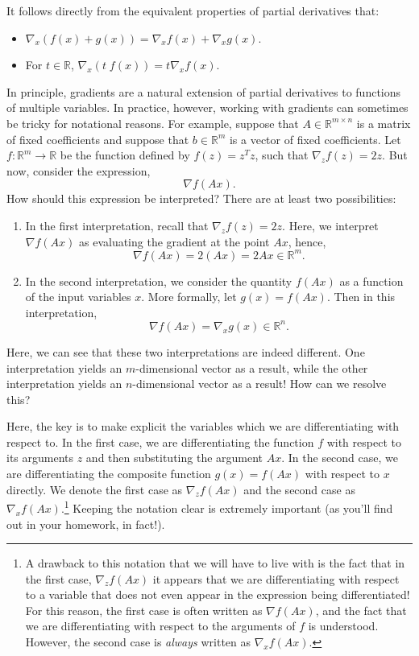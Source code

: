 \documentclass[12pt]{article}
\begin{document}
It follows directly from the equivalent properties of partial
derivatives that:
\begin{itemize}
\item $\nabla_x (f(x) + g(x)) = \nabla_x f(x) + \nabla_x g(x)$.
\item For $t \in \mathbb{R}$, $\nabla_x (t\;f(x)) = t \nabla_x f(x)$.
\end{itemize}

In principle, gradients are a natural extension of partial derivatives
to functions of multiple variables.  In practice, however, working with
gradients can sometimes be tricky for notational reasons.  
For example,
suppose that $A \in \mathbb{R}^{m \times n}$ is a matrix of fixed coefficients and 
suppose that $b \in \mathbb{R}^m$ is a vector of fixed coefficients.
Let $f : \mathbb{R}^{m} \rightarrow \mathbb{R}$ be the function defined by
$f(z) = z^T z$, such that $\nabla_z f(z) = 2z$.
But now, consider the expression,
\[ \nabla f(Ax). \]
How should this expression be interpreted?  There are at least two possibilities:
\begin{enumerate}
\item 
  In the first interpretation, recall that $\nabla_z f(z) = 2z$.  Here, we
  interpret $\nabla f(Ax)$ as evaluating the gradient at the point $Ax$, 
  hence, 
  \[ \nabla f(Ax) = 2(Ax) = 2Ax \in \mathbb{R}^m. \]
\item
  In the second interpretation, we consider the quantity $f(Ax)$ as a function of the
  input variables $x$.  More formally, let $g(x) = f(Ax)$.  Then in this interpretation,
  \[ \nabla f(Ax) = \nabla_x g(x) \in \mathbb{R}^n. \]
\end{enumerate}
Here, we can see that these two interpretations are indeed different.  One interpretation
yields an $m$-dimensional vector as a result, while the other interpretation yields an
$n$-dimensional vector as a result!  How can we resolve this?

Here, the key is to make explicit the variables which we are differentiating with respect to.
In the first case, we are differentiating the function $f$ with respect to its arguments $z$
and then substituting the argument $Ax$.  In the second case, we are differentiating the
composite function $g(x) = f(Ax)$ with respect to $x$ directly.  We denote the first
case as $\nabla_z f(Ax)$ and the second case as $\nabla_x f(Ax)$.\footnote{A drawback to this notation
that we will have to live with is the fact that in the first case, $\nabla_z f(Ax)$ it appears
that we are differentiating with respect to a variable that does not even appear in the expression
being differentiated!  For this reason, the first case is often written as $\nabla f(Ax)$, and the fact
that we are differentiating with respect to the arguments of $f$ is understood.  However,
the second case is \emph{always} written as $\nabla_x f(Ax)$.}
Keeping the notation
clear is extremely important (as you'll find out in your homework, in fact!).  
\end{document}
